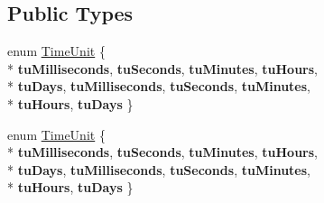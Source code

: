 \subsection*{Public Types}
\begin{DoxyCompactItemize}
\item 
enum \hyperlink{class_q_c_p_axis_ticker_time_a5c48ded8c6d3a1aca9b68219469fea3e}{Time\+Unit} \{ \\*
{\bfseries tu\+Milliseconds}, 
{\bfseries tu\+Seconds}, 
{\bfseries tu\+Minutes}, 
{\bfseries tu\+Hours}, 
\\*
{\bfseries tu\+Days}, 
{\bfseries tu\+Milliseconds}, 
{\bfseries tu\+Seconds}, 
{\bfseries tu\+Minutes}, 
\\*
{\bfseries tu\+Hours}, 
{\bfseries tu\+Days}
 \}
\item 
enum \hyperlink{class_q_c_p_axis_ticker_time_a5c48ded8c6d3a1aca9b68219469fea3e}{Time\+Unit} \{ \\*
{\bfseries tu\+Milliseconds}, 
{\bfseries tu\+Seconds}, 
{\bfseries tu\+Minutes}, 
{\bfseries tu\+Hours}, 
\\*
{\bfseries tu\+Days}, 
{\bfseries tu\+Milliseconds}, 
{\bfseries tu\+Seconds}, 
{\bfseries tu\+Minutes}, 
\\*
{\bfseries tu\+Hours}, 
{\bfseries tu\+Days}
 \}
\end{DoxyCompactItemize}
